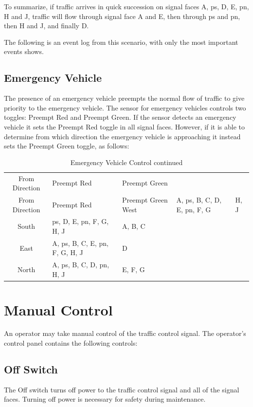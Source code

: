 \documentclass[letterpaper,twoside]{article}
\begin{document}
To summarize, if traffic arrives in quick succession on signal faces
A, ps, D, E, pn, H and J, traffic will flow through signal face
A and E, then through ps and pn, then H and J, and finally D.

The following is an event log from this scenario, with only the most
important events shows.



\subsection{Emergency Vehicle}

The presence of an emergency vehicle preempts the normal flow of traffic
to give priority to the emergency vehicle. The sensor for emergency
vehicles controls two toggles: Preempt Red and Preempt Green.
If the sensor detects an emergency
vehicle it sets the Preempt Red toggle in all signal faces.
However, if it is able to determine from which direction the emergency vehicle
is approaching it instead sets the Preempt Green toggle, as follows:

\begin{longtable}{c | l | l}
  \caption{Emergency Vehicle control} \\
  From Direction & Preempt Red & Preempt Green \endfirsthead
  \caption{Emergency Vehicle Control continued} \\
  From Direction & Preempt Red & Preempt Green \endhead
  \hline West & A, ps, B, C, D, E, pn, F, G & H, J \\
  \hline South & ps, D, E, pn, F, G, H, J & A, B, C \\
  \hline East & A, ps, B, C, E, pn, F, G, H, J & D \\
  \hline North & A, ps, B, C, D, pn, H, J & E, F, G \\
  \hline
\end{longtable}

\section{Manual Control}

An operator may take manual control of the traffic control signal.
The operator's control panel contains the following controls:

\subsection{Off Switch}
The Off switch turns off power to the traffic control signal and all
of the signal faces.  Turning off power is necessary for safety during
maintenance.
\end{document}
